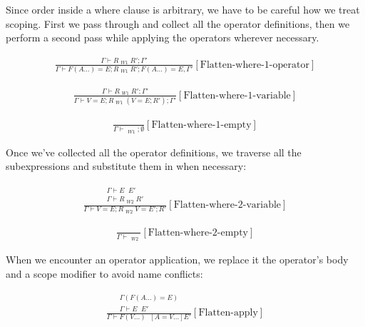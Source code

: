 \documentclass{scrartcl}
\DeclareMathOperator{\flattenrel}{\overset{flatten}{\Rightarrow}}
\begin{document}
    Since order inside a where clause is arbitrary, we have to be careful how we treat scoping. First we pass through and collect all the operator definitions, then we perform a second pass while applying the operators wherever necessary.
    
    \begin{align*}
    \frac{
        \Gamma \vdash R \flattenrel_{W1} R'; \Gamma'
    }{
        \Gamma \vdash F(A...) = E; R \flattenrel_{W1} R'; F(A...) = E, \Gamma'
    }[\text{Flatten-where-1-operator}]
    \end{align*}
    
    \begin{align*}
    \frac{
        \Gamma \vdash R \flattenrel_{W1} R'; \Gamma'
    }{
        \Gamma \vdash V = E; R \flattenrel_{W1} (V = E; R'); \Gamma'
    }[\text{Flatten-where-1-variable}]
    \end{align*}
    
    \begin{align*}
    \frac{}{
        \Gamma \vdash \flattenrel_{W1} ; \emptyset
    }[\text{Flatten-where-1-empty}]
    \end{align*}
    
    Once we've collected all the operator definitions, we traverse all the subexpressions and substitute them in when necessary:
    
    \begin{align*}
    \frac{
        \begin{matrix}
        \Gamma \vdash E \flattenrel E' \\
        \Gamma \vdash R \flattenrel_{W2} R'
        \end{matrix}
    }{
        \Gamma \vdash V = E; R \flattenrel_{W2} V = E'; R'
    }[\text{Flatten-where-2-variable}]
    \end{align*}
    
    \begin{align*}
    \frac{}{
        \Gamma \vdash \flattenrel_{W2}
    }[\text{Flatten-where-2-empty}]
    \end{align*}
    
    When we encounter an operator application, we replace it the operator's body and a scope modifier to avoid name conflicts:
    
    \begin{align*}
    \frac{
        \begin{matrix}
        \Gamma(F(A...) = E) \\
        \Gamma \vdash E \flattenrel E'
        \end{matrix}
    }{
        \Gamma \vdash F(V...) \flattenrel [A=V...]E'
    }[\text{Flatten-apply}]
    \end{align*}
    
\end{document}
